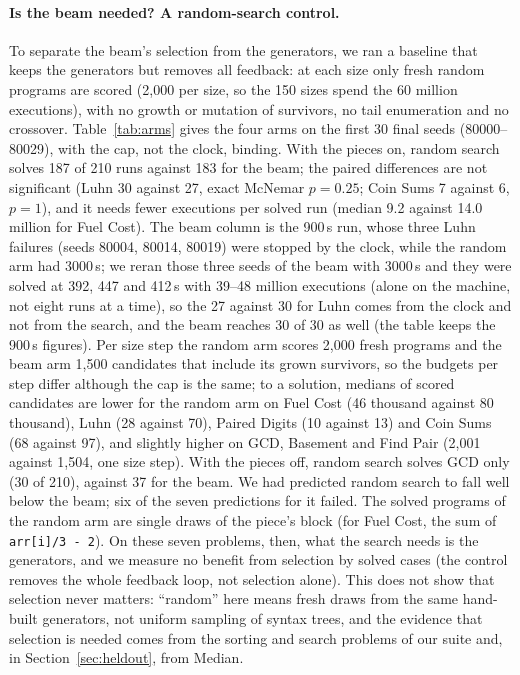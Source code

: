\documentclass[sigconf,nonacm]{acmart}
\begin{document}
\paragraph{Is the beam needed? A random-search control.}
To separate the beam's selection from the generators, we ran a baseline that keeps the generators but removes all feedback: at each size only fresh random programs are scored (2,000 per size, so the 150 sizes spend the 60 million executions), with no growth or mutation of survivors, no tail enumeration and no crossover. Table~\ref{tab:arms} gives the four arms on the first 30 final seeds (80000--80029), with the cap, not the clock, binding. With the pieces on, random search solves 187 of 210 runs against 183 for the beam; the paired differences are not significant (Luhn 30 against 27, exact McNemar $p=0.25$; Coin Sums 7 against 6, $p=1$), and it needs fewer executions per solved run (median 9.2 against 14.0 million for Fuel Cost). The beam column is the 900\,s run, whose three Luhn failures (seeds 80004, 80014, 80019) were stopped by the clock, while the random arm had 3000\,s; we reran those three seeds of the beam with 3000\,s and they were solved at 392, 447 and 412\,s with 39--48 million executions (alone on the machine, not eight runs at a time), so the 27 against 30 for Luhn comes from the clock and not from the search, and the beam reaches 30 of 30 as well (the table keeps the 900\,s figures). Per size step the random arm scores 2,000 fresh programs and the beam arm 1,500 candidates that include its grown survivors, so the budgets per step differ although the cap is the same; to a solution, medians of scored candidates are lower for the random arm on Fuel Cost (46 thousand against 80 thousand), Luhn (28 against 70), Paired Digits (10 against 13) and Coin Sums (68 against 97), and slightly higher on GCD, Basement and Find Pair (2,001 against 1,504, one size step). With the pieces off, random search solves GCD only (30 of 210), against 37 for the beam. We had predicted random search to fall well below the beam; six of the seven predictions for it failed. The solved programs of the random arm are single draws of the piece's block (for Fuel Cost, the sum of \texttt{arr[i]/3 - 2}). On these seven problems, then, what the search needs is the generators, and we measure no benefit from selection by solved cases (the control removes the whole feedback loop, not selection alone). This does not show that selection never matters: ``random'' here means fresh draws from the same hand-built generators, not uniform sampling of syntax trees, and the evidence that selection is needed comes from the sorting and search problems of our suite and, in Section~\ref{sec:heldout}, from Median.
\end{document}
